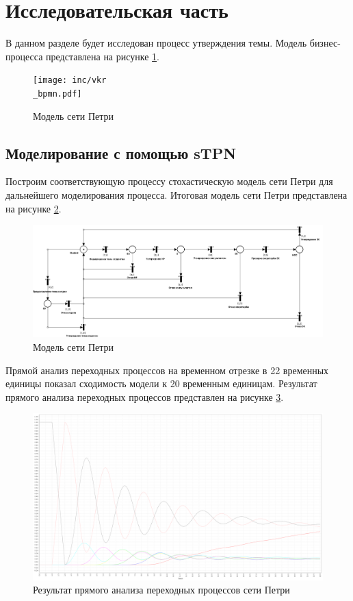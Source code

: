\section{Исследовательская часть}

В данном разделе будет исследован процесс утверждения темы. Модель бизнес-процесса представлена на рисунке \ref{fig:vkrbpmn}.

\begin{figure}[h!btp]
	\centering
	\texttt{[image: inc/vkr\\\_bpmn.pdf]}
	\caption{Модель сети Петри}
	\label{fig:vkrbpmn}	
\end{figure}

\subsection{Моделирование с помощью sTPN}

Построим соответствующую процессу стохастическую модель сети Петри для дальнейшего моделирования процесса. Итоговая модель сети Петри представлена на рисунке \ref{fig:tpn}.

\begin{figure}[h!btp]
	\centering
	\includegraphics[width=\textwidth]{inc/timed.pdf}
	\caption{Модель сети Петри}
	\label{fig:tpn}	
\end{figure}

Прямой анализ переходных процессов\cite{forward-transient} на временном отрезке в 22 временных единицы показал сходимость модели к 20 временным единицам. Результат прямого анализа переходных процессов представлен на рисунке \ref{fig:ft}.

\clearpage

\begin{figure}
	\centering
	\includegraphics[width=\textwidth]{inc/forward_transient.png}
	\caption{Результат прямого анализа переходных процессов сети Петри}
	\label{fig:ft}
\end{figure}

